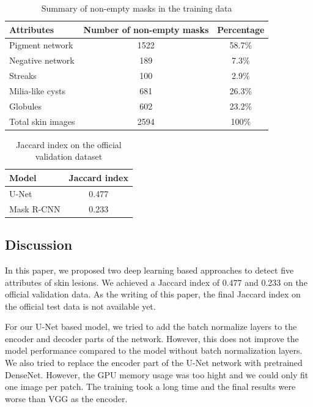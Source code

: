 \documentclass{article}
\begin{document}
\begin{table}
  \caption{Summary of non-empty masks in the training data}
  \label{summary-training}
  \centering
  \begin{tabular}{lcc}
    \toprule
    Attributes     &   Number of non-empty masks   & Percentage   \\
    \midrule
    Pigment network & 1522  & 58.7\%    \\
    Negative network     & 189 & 7.3\%      \\
    Streaks     & 100       & 2.9\%  \\
    Milia-like cysts & 681  & 26.3\%     \\
    Globules     & 602 & 23.2\%      \\
    \midrule
    Total skin images & 2594 & 100\% \\
    \bottomrule
  \end{tabular}
\end{table}


\begin{table}
  \caption{Jaccard index on the official validation dataset}
  \label{sample-table}
  \centering
  \begin{tabular}{lc}
    \toprule
    Model     & Jaccard index   \\
    \midrule
    U-Net & 0.477     \\
    Mask R-CNN     & 0.233      \\
    \bottomrule
  \end{tabular}
\end{table}


\subsection{Discussion}
In this paper, we proposed two deep learning based approaches to detect five attributes of skin lesions. We achieved a Jaccard index of 0.477 and 0.233 on the official validation data. As the writing of this paper, the final Jaccard index on the official test data is not available yet. 

For our U-Net based model, we tried to add the batch normalize layers to the encoder and decoder parts of the network. However, this does not improve the model performance compared to the model without batch normalization layers. We also tried to replace the encoder part of the U-Net network with pretrained DenseNet. However, the GPU memory usage was too hight and we could only fit one image per patch. The training took a long time and the final results were worse than VGG as the encoder. 
\end{document}
